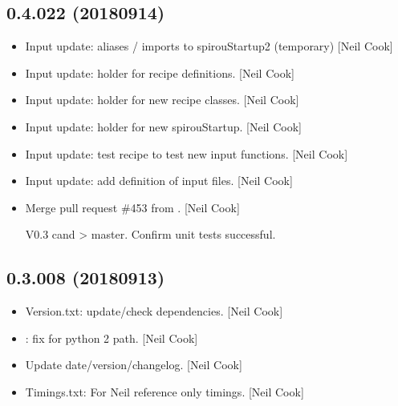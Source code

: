 \documentclass[a4paper,10pt,english]{report}
\begin{document}
\subsection{0.4.022 (2018\sphinxhyphen{}09\sphinxhyphen{}14)}
\label{\detokenize{misc/changelog:id343}}\begin{itemize}
\item {} 
Input update:  aliases / imports to
spirouStartup2 (temporary) {[}Neil Cook{]}

\item {} 
Input update:  \sphinxhyphen{} holder for recipe definitions. {[}Neil Cook{]}

\item {} 
Input update:  \sphinxhyphen{} holder for new recipe classes. {[}Neil
Cook{]}

\item {} 
Input update:  \sphinxhyphen{} holder for new spirouStartup. {[}Neil
Cook{]}

\item {} 
Input update:  \sphinxhyphen{} test recipe to test new input
functions. {[}Neil Cook{]}

\item {} 
Input update: add  \sphinxhyphen{} definition of input files. {[}Neil
Cook{]}

\item {} 
Merge pull request \#453 from . {[}Neil Cook{]}

V0.3 cand \textendash{}\textgreater{} master. Confirm unit tests successful.

\end{itemize}


\subsection{0.3.008 (2018\sphinxhyphen{}09\sphinxhyphen{}13)}
\label{\detokenize{misc/changelog:id344}}\begin{itemize}
\item {} 
Version.txt: update/check dependencies. {[}Neil Cook{]}

\item {} 
: fix for python 2 path. {[}Neil Cook{]}

\item {} 
Update date/version/changelog. {[}Neil Cook{]}

\item {} 
Timings.txt: For Neil reference only  timings. {[}Neil Cook{]}

\end{itemize}
\end{document}
